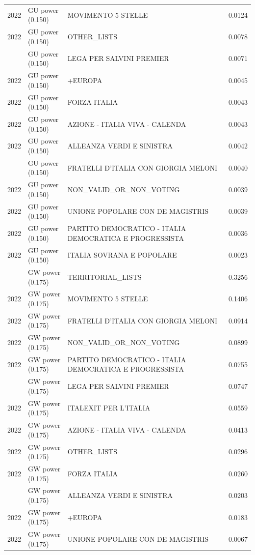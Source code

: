 \begin{longtable}[t]{rllr}
2022 & GU power (0.150) & MOVIMENTO 5 STELLE & 0.0124\\
2022 & GU power (0.150) & OTHER\_LISTS & 0.0078\\
\addlinespace
2022 & GU power (0.150) & LEGA PER SALVINI PREMIER & 0.0071\\
2022 & GU power (0.150) & +EUROPA & 0.0045\\
2022 & GU power (0.150) & FORZA ITALIA & 0.0043\\
2022 & GU power (0.150) & AZIONE - ITALIA VIVA - CALENDA & 0.0043\\
2022 & GU power (0.150) & ALLEANZA VERDI E SINISTRA & 0.0042\\
\addlinespace
2022 & GU power (0.150) & FRATELLI D'ITALIA CON GIORGIA MELONI & 0.0040\\
2022 & GU power (0.150) & NON\_VALID\_OR\_NON\_VOTING & 0.0039\\
2022 & GU power (0.150) & UNIONE POPOLARE CON DE MAGISTRIS & 0.0039\\
2022 & GU power (0.150) & PARTITO DEMOCRATICO - ITALIA DEMOCRATICA E PROGRESSISTA & 0.0036\\
2022 & GU power (0.150) & ITALIA SOVRANA E POPOLARE & 0.0023\\
\addlinespace
2022 & GW power (0.175) & TERRITORIAL\_LISTS & 0.3256\\
2022 & GW power (0.175) & MOVIMENTO 5 STELLE & 0.1406\\
2022 & GW power (0.175) & FRATELLI D'ITALIA CON GIORGIA MELONI & 0.0914\\
2022 & GW power (0.175) & NON\_VALID\_OR\_NON\_VOTING & 0.0899\\
2022 & GW power (0.175) & PARTITO DEMOCRATICO - ITALIA DEMOCRATICA E PROGRESSISTA & 0.0755\\
\addlinespace
2022 & GW power (0.175) & LEGA PER SALVINI PREMIER & 0.0747\\
2022 & GW power (0.175) & ITALEXIT PER L'ITALIA & 0.0559\\
2022 & GW power (0.175) & AZIONE - ITALIA VIVA - CALENDA & 0.0413\\
2022 & GW power (0.175) & OTHER\_LISTS & 0.0296\\
2022 & GW power (0.175) & FORZA ITALIA & 0.0260\\
\addlinespace
2022 & GW power (0.175) & ALLEANZA VERDI E SINISTRA & 0.0203\\
2022 & GW power (0.175) & +EUROPA & 0.0183\\
2022 & GW power (0.175) & UNIONE POPOLARE CON DE MAGISTRIS & 0.0067\\

\end{longtable}
